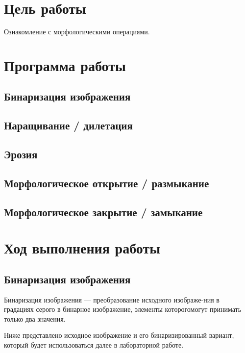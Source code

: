 







\section{Цель работы}

Ознакомление с морфологическими операциями.

\section{Программа работы}
\subsection{Бинаризация изображения}
\subsection{Наращивание / дилетация}
\subsection{Эрозия}
\subsection{Морфологическое открытие / размыкание}
\subsection{Морфологическое закрытие / замыкание}

\section{Ход выполнения работы}

\subsection{Бинаризация изображения}

Бинаризация изображения — преобразование исходного изображе-ния в градациях серого в бинарное изображение, элементы которогомогут принимать только два значения.

Ниже представлено исходное изображение и его бинаризированный вариант, который будет использоваться далее в лабораторной работе.


